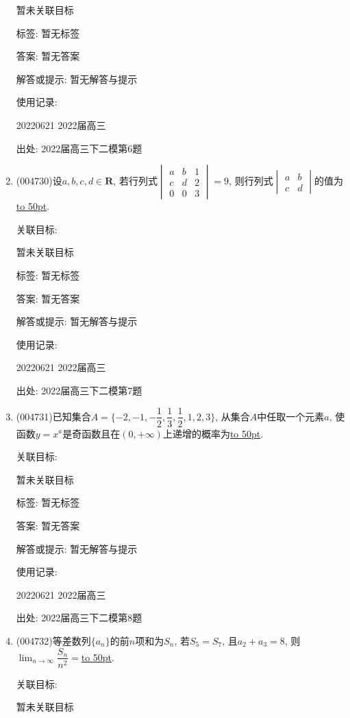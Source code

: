 \documentclass[10pt,a4paper]{article}
\newcommand{\blank}[1]{\underline{\hbox to #1pt{}}}
\begin{document}
\begin{enumerate}[1.]
暂未关联目标



标签: 暂无标签

答案: 暂无答案

解答或提示: 暂无解答与提示

使用记录:

20220621	2022届高三	


出处: 2022届高三下二模第6题
\item { (004730)}设$a,b,c,d\in \mathbf{R}$, 若行列式$\begin{vmatrix}    a & b & 1  \\ c & d & 2  \\ 0 & 0 & 3  \end{vmatrix}=9$, 则行列式$\begin{vmatrix} a & b  \\ c & d  \end{vmatrix}$的值为\blank{50}.


关联目标:

暂未关联目标



标签: 暂无标签

答案: 暂无答案

解答或提示: 暂无解答与提示

使用记录:

20220621	2022届高三	


出处: 2022届高三下二模第7题
\item { (004731)}已知集合$A=\{-2,-1,-\dfrac 12,\dfrac 13,\dfrac 12,1,2,3\}$, 从集合$A$中任取一个元素$a$, 使函数$y=x^a$是奇函数且在$(0,+\infty)$上递增的概率为\blank{50}.


关联目标:

暂未关联目标



标签: 暂无标签

答案: 暂无答案

解答或提示: 暂无解答与提示

使用记录:

20220621	2022届高三	


出处: 2022届高三下二模第8题
\item { (004732)}等差数列$\{a_n\}$的前$n$项和为$S_n$, 若$S_5=S_7$, 且$a_2+a_3=8$, 则$\displaystyle\lim_{n\to\infty}\dfrac{S_n}{n^2}=$\blank{50}.


关联目标:

暂未关联目标




\end{enumerate}
\end{document}
